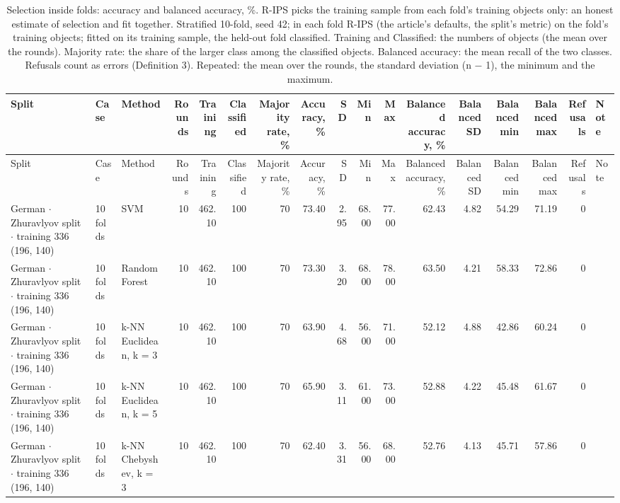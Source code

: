 \begin{longtable}{lllrrrrrrrrrrrrrl}
  \caption{Selection inside folds: accuracy and balanced accuracy, \%. R-IPS picks the training sample from each fold's training objects only: an honest estimate of selection and fit together. Stratified 10-fold, seed 42; in each fold R-IPS (the article's defaults, the split's metric) on the fold's training objects; fitted on its training sample, the held-out fold classified. Training and Classified: the numbers of objects (the mean over the rounds). Majority rate: the share of the larger class among the classified objects. Balanced accuracy: the mean recall of the two classes. Refusals count as errors (Definition 3). Repeated: the mean over the rounds, the standard deviation (n $-$ 1), the minimum and the maximum.}\label{tab:nested-selection} \\
  \toprule
  Split & Case & Method & Rounds & Training & Classified & Majority rate, \% & Accuracy, \% & SD & Min & Max & Balanced accuracy, \% & Balanced SD & Balanced min & Balanced max & Refusals & Note \\
  \midrule
  \endfirsthead
  \toprule
  Split & Case & Method & Rounds & Training & Classified & Majority rate, \% & Accuracy, \% & SD & Min & Max & Balanced accuracy, \% & Balanced SD & Balanced min & Balanced max & Refusals & Note \\
  \midrule
  \endhead
  \bottomrule
  \endfoot
  German $\cdot$ Zhuravlyov split $\cdot$ training 336 (196, 140) & 10 folds & SVM & 10 & 462.10 & 100 & 70 & 73.40 & 2.95 & 68.00 & 77.00 & 62.43 & 4.82 & 54.29 & 71.19 & 0 &  \\
  German $\cdot$ Zhuravlyov split $\cdot$ training 336 (196, 140) & 10 folds & Random Forest & 10 & 462.10 & 100 & 70 & 73.30 & 3.20 & 68.00 & 78.00 & 63.50 & 4.21 & 58.33 & 72.86 & 0 &  \\
  German $\cdot$ Zhuravlyov split $\cdot$ training 336 (196, 140) & 10 folds & k-NN Euclidean, k = 3 & 10 & 462.10 & 100 & 70 & 63.90 & 4.68 & 56.00 & 71.00 & 52.12 & 4.88 & 42.86 & 60.24 & 0 &  \\
  German $\cdot$ Zhuravlyov split $\cdot$ training 336 (196, 140) & 10 folds & k-NN Euclidean, k = 5 & 10 & 462.10 & 100 & 70 & 65.90 & 3.11 & 61.00 & 73.00 & 52.88 & 4.22 & 45.48 & 61.67 & 0 &  \\
  German $\cdot$ Zhuravlyov split $\cdot$ training 336 (196, 140) & 10 folds & k-NN Chebyshev, k = 3 & 10 & 462.10 & 100 & 70 & 62.40 & 3.31 & 56.00 & 68.00 & 52.76 & 4.13 & 45.71 & 57.86 & 0 &  \\

\end{longtable}
